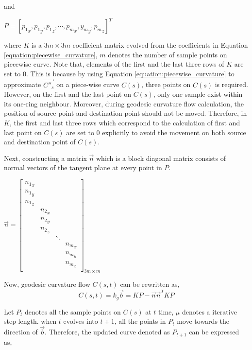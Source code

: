 and 

$P= [{p_{1}}_{x}, {p_{1}}_{y}, {p_{1}}_{z}, \cdots , {p_{m}}_{x}, {y_{m}}_{y}, {p_{m}}_{z}]^{T}$

where $K$ is a  $3m\times 3m$ coefficient matrix evolved from the coefficients in Equation \ref{equation:piecewise_curvature}, $m$ denotes the number of sample points on piecewise curve. Note that, elements of the first and the last three rows of $K$ are set to $0$. This is because by using Equation \ref{equation:piecewise_curvature} to approximate $\vec{C''_{s}}$ on a piece-wise curve $C(s)$, three points on $C(s)$ is required. However, on the first and the last point on $C(s)$, only one sample exist within its one-ring neighbour. Moreover, during geodesic curvature flow calculation, the position of source point and destination point should not be moved. Therefore, in $K$, the first and last three rows which correspond to the calculation of first and last point on $C(s)$ are set to $0$ explicitly to avoid the movement on both source and destination point of $C(s)$.

Next, constructing a matrix $\vec{n}$ which is a block diagonal matrix consists of normal vectors of the tangent plane at every point in $P$.

$\vec{n}=
\begin{bmatrix}
 	{n_{1}}_{x} &			&			&\\		
 	{n_{1}}_{y} &			&			&\\
 	{n_{1}}_{z} &			&			&\\
 	&			{n_{2}}_{x} & 			&\\
	&			{n_{2}}_{y} &			&\\
 	&			{n_{2}}_{z} &			&\\
 	&  			& 			\ddots		&\\ 	
 	&  			&  			&  			{n_{m}}_{x}\\ 
 	&			&			&			{n_{m}}_{y}\\
 	&			&			&			{n_{m}}_{z}\\ 	
\end{bmatrix}_{3m\times m}
$

Now, geodesic curvature flow $C(s,t)$ can be rewritten as,
\begin{equation}
C(s,t) = k_{g}\vec{b}=KP-\vec{n}\vec{n}^{T}KP
\label{equation:piecewise_curvature_matrix2}
\end{equation}

Let $P_{t}$ denotes all the sample points on $C(s)$ at $t$ time, $\mu$ denotes a iterative step length. when $t$ evolves into $t+1$, all the points in $P_{t}$ move towards the direction of $\vec{b}$. Therefore, the updated curve denoted as $P_{t+1}$  can be expressed as, 

